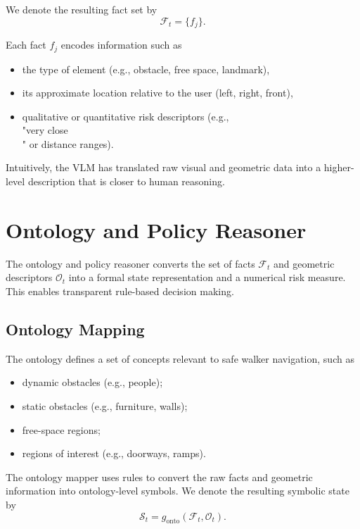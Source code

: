 \documentclass{article}
\begin{document}
We denote the resulting fact set by
\begin{equation}
    \mathcal{F}_t = \{ f_j \}.
\end{equation}

Each fact $f_j$ encodes information such as
\begin{itemize}
    \item the type of element (e.g., obstacle, free space, landmark),
    \item its approximate location relative to the user (left, right, front),
    \item qualitative or quantitative risk descriptors (e.g., \\"very close\\" or distance ranges).
\end{itemize}

Intuitively, the VLM has translated raw visual and geometric data into a higher-level description that is closer to human reasoning.

\section{Ontology and Policy Reasoner}

The ontology and policy reasoner converts the set of facts $\mathcal{F}_t$ and geometric descriptors $\mathcal{O}_t$ into a formal state representation and a numerical risk measure. This enables transparent rule-based decision making.

\subsection{Ontology Mapping}

The ontology defines a set of concepts relevant to safe walker navigation, such as
\begin{itemize}
    \item dynamic obstacles (e.g., people);
    \item static obstacles (e.g., furniture, walls);
    \item free-space regions;
    \item regions of interest (e.g., doorways, ramps).
\end{itemize}

The ontology mapper uses rules to convert the raw facts and geometric information into ontology-level symbols. We denote the resulting symbolic state by
\begin{equation}
    \mathcal{S}_t = g_{\text{onto}}(\mathcal{F}_t, \mathcal{O}_t).
\end{equation}
\end{document}

